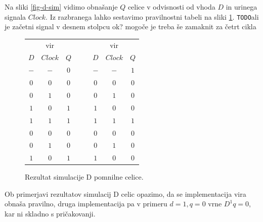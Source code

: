 \documentclass[a4paper, 11pt]{article}
\newcommand{\todo}{\textcolor{BrickRed}{\texttt{TODO}}} %
\begin{document}
Na sliki \ref{fig-d-sim} vidimo obnašanje $Q$ celice v odvisnosti od vhoda $D$ in urinega signala $Clock$. Iz razbranega lahko sestavimo pravilnostni tabeli na sliki \ref{tab-d-sim}.
\todo ali je začetni signal v desnem stolpcu ok? mogoče je treba še zamaknit za četrt cikla
\begin{figure}[h!]
	\centering
	\small
	\begin{tabular}{cc|cccc|c}
	\multicolumn{3}{c}{vir \cite{quantum_dot}} & $\quad$ & \multicolumn{3}{c}{vir \cite{a_novel_approach}}\\
	$D$ & $Clock$ & $Q$ && $D$ & $Clock$ & $Q$ \\
	\cline{1-3} \cline{5-7}
	$-$ & $-$ & $0$ && $-$ & $-$ & $1$\\
	$0$ & $0$ & $0$ && $0$ & $0$ & $0$\\
	$0$ & $1$ & $0$ && $0$ & $1$ & $0$\\
	$1$ & $0$ & $1$ && $1$ & $0$ & $0$\\
	\cline{1-3} \cline{5-7}
	$1$ & $1$ & $1$ && $1$ & $1$ & $1$\\
	$0$ & $0$ & $0$ && $0$ & $0$ & $0$\\
	$0$ & $1$ & $0$ && $0$ & $1$ & $0$\\
	$1$ & $0$ & $1$ && $1$ & $0$ & $0$\\
	\end{tabular}
	\caption{Rezultat simulacije D pomnilne celice.}
	\label{tab-d-sim}
\end{figure}

Ob primerjavi rezultatov simulacij D celic opazimo, da se implementacija vira \cite{quantum_dot} obnaša pravilno, druga implementacija pa v primeru $d=1, q=0$ vrne $D^1q=0$, kar ni skladno s pričakovanji.
\end{document}
